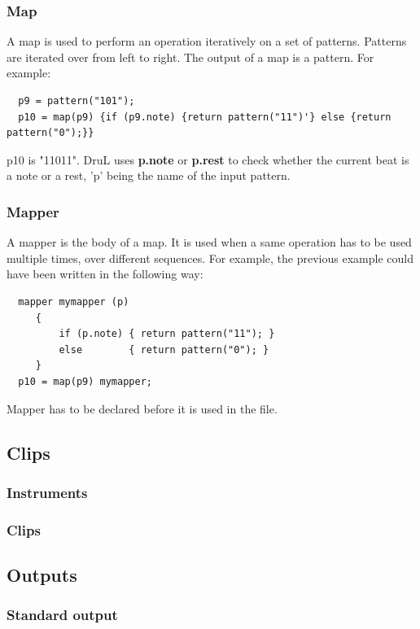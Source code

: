 \documentclass[11pt,twoside]{article}
\begin{document}
\subsubsection{Map}
A map is used to perform an operation iteratively on a set of patterns.
Patterns are iterated over from left to right. The output of a map is
a pattern. For example:
\begin{verbatim}
  p9 = pattern("101");
  p10 = map(p9) {if (p9.note) {return pattern("11")'} else {return  pattern("0");}}
\end{verbatim}
p10 is "11011". DruL uses \textbf{p.note} or \textbf{p.rest} to check whether
the current beat is a note or a rest, 'p' being the name of the input pattern.


\subsubsection{Mapper}
A mapper is the body of a map. It is used when a same operation has to be
used multiple times, over different sequences.
For example, the previous example could have been written in the following
way:
\begin{verbatim}
  mapper mymapper (p)
     {
         if (p.note) { return pattern("11"); }
         else        { return pattern("0"); }
     }
  p10 = map(p9) mymapper;
\end{verbatim}
Mapper has to be declared before it is used in the file.

\subsection{Clips}

\subsubsection{Instruments}


\subsubsection{Clips}

\subsection{Outputs}

\subsubsection{Standard output}
\end{document}
